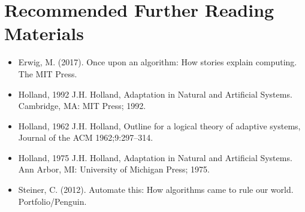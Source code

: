 \documentclass[
  letterpaper,
  DIV=11,
  numbers=noendperiod]{scrreprt}
\providecommand{\tightlist}{%
  \setlength{\itemsep}{0pt}\setlength{\parskip}{0pt}}\usepackage{longtable,booktabs,array}
\begin{document}

\chapter{Recommended Further Reading
Materials}\label{recommended-further-reading-materials}

\begin{itemize}
\tightlist
\item
  Erwig, M. (2017). Once upon an algorithm: How stories explain
  computing. The MIT Press.
\item
  Holland, 1992 J.H. Holland, Adaptation in Natural and Artificial
  Systems. Cambridge, MA: MIT Press; 1992.
\item
  Holland, 1962 J.H. Holland, Outline for a logical theory of adaptive
  systems, Journal of the ACM 1962;9:297--314.
\item
  Holland, 1975 J.H. Holland, Adaptation in Natural and Artificial
  Systems. Ann Arbor, MI: University of Michigan Press; 1975.
\item
  Steiner, C. (2012). Automate this: How algorithms came to rule our
  world. Portfolio/Penguin.
\end{itemize}
\end{document}
